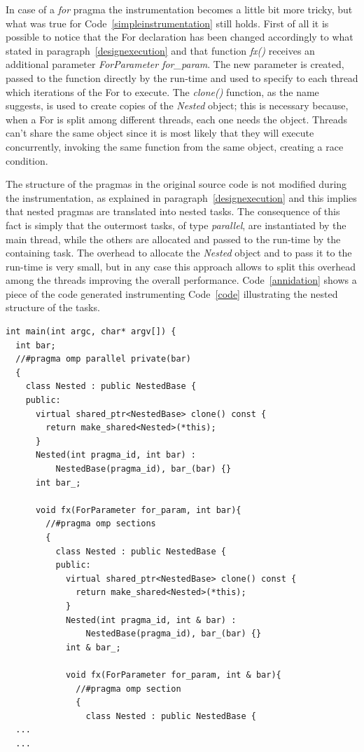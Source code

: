 \documentclass[a4paper,11pt,oneside]{book}
\begin{document}
In case of a \emph{for} pragma the instrumentation becomes a little bit more tricky, but what was true for Code~\ref{simpleinstrumentation} still holds. First of all it is possible to notice that the For declaration has been changed accordingly to what stated in paragraph~\ref{designexecution} and that function \emph{fx()} receives an additional parameter \emph{ForParameter for\_param}. The new parameter is created, passed to the function directly by the run-time and used to specify to each thread which iterations of the For to execute. The \emph{clone()} function, as the name suggests, is used to create copies of the \emph{Nested} object; this is necessary because, when a For is split among different threads, each one needs the object. Threads can’t share the same object since it is most likely that they will execute concurrently, invoking the same function from the same object, creating a race condition. 

The structure of the pragmas in the original source code is not modified during the instrumentation, as explained in paragraph~\ref{designexecution} and this implies that nested pragmas are translated into nested tasks. The consequence of this fact is simply that the outermost tasks, of type \emph{parallel}, are instantiated by the main thread, while the others are allocated and passed to the run-time by the containing task. The overhead to allocate the \emph{Nested} object and to pass it to the run-time is very small, but in any case this approach allows to split this overhead among the threads improving the overall performance. Code~\ref{annidation} shows a piece of the code generated instrumenting Code~\ref{code} illustrating the nested structure of the tasks.

\begin{lstlisting}[language=CCC, caption=Example of tasks annidation from Code~\ref{code}., label=annidation]
int main(int argc, char* argv[]) {
  int bar;
  //#pragma omp parallel private(bar)
  {
    class Nested : public NestedBase {
    public: 
      virtual shared_ptr<NestedBase> clone() const { 
        return make_shared<Nested>(*this); 
      } 
      Nested(int pragma_id, int bar) : 
          NestedBase(pragma_id), bar_(bar) {}
      int bar_;
  
      void fx(ForParameter for_param, int bar){
        //#pragma omp sections
        {
          class Nested : public NestedBase {
          public: 
            virtual shared_ptr<NestedBase> clone() const { 
              return make_shared<Nested>(*this); 
            } 
            Nested(int pragma_id, int & bar) : 
                NestedBase(pragma_id), bar_(bar) {}
            int & bar_;
            
            void fx(ForParameter for_param, int & bar){
              //#pragma omp section
              {
                class Nested : public NestedBase {
  ...
  ...
\end{lstlisting}
\end{document}

